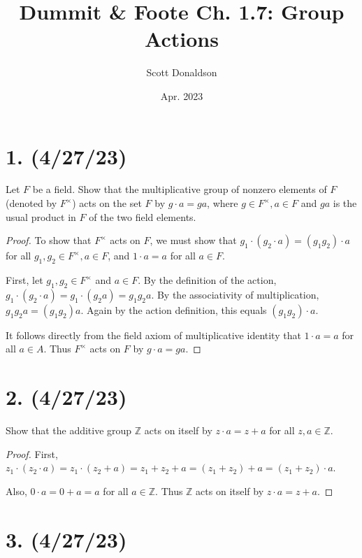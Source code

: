 \documentclass{article}
\title{Dummit \& Foote Ch. 1.7: Group Actions}
\author{Scott Donaldson}
\date{Apr. 2023}
\begin{document}
\maketitle

\section*{1. (4/27/23)}

Let $F$ be a field. Show that the multiplicative group of nonzero elements of $F$ (denoted by $F^\times$) acts on the set $F$ by $g \cdot a = ga$, where $g \in F^\times, a \in F$ and $ga$ is the usual product in $F$ of the two field elements.

\begin{proof}
    To show that $F^\times$ acts on $F$, we must show that $g_1 \cdot (g_2 \cdot a) = (g_1 g_2) \cdot a$ for all $g_1, g_2 \in F^\times, a \in F$, and $1 \cdot a = a$ for all $a \in F$.

    First, let $g_1, g_2 \in F^\times$ and $a \in F$. By the definition of the action, $g_1 \cdot (g_2 \cdot a) = g_1 \cdot (g_2 a) = g_1 g_2 a$. By the associativity of multiplication, $g_1 g_2 a = (g_1 g_2) a$. Again by the action definition, this equals $(g_1 g_2) \cdot a$.
    
    It follows directly from the field axiom of multiplicative identity that $1 \cdot a = a$ for all $a \in A$. Thus $F^\times$ acts on $F$ by $g \cdot a = ga$.
\end{proof}

\section*{2. (4/27/23)}

Show that the additive group $\mathbb{Z}$ acts on itself by $z \cdot a = z + a$ for all $z, a \in \mathbb{Z}$.

\begin{proof}
    First, $z_1 \cdot (z_2 \cdot a) = z_1 \cdot (z_2 + a) = z_1 + z_2 + a = (z_1 + z_2) + a = (z_1 + z_2) \cdot a$.

    Also, $0 \cdot a = 0 + a = a$ for all $a \in \mathbb{Z}$. Thus $\mathbb{Z}$ acts on itself by $z \cdot a = z + a$.
\end{proof}

\section*{3. (4/27/23)}
\end{document}
